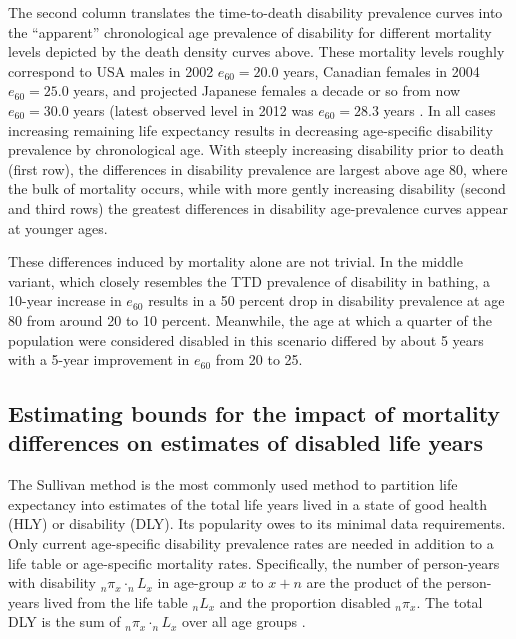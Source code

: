 \documentclass[11pt,oneside,a4paper]{article} %
\begin{document}
The second column translates the time-to-death disability prevalence curves into
the ``apparent'' chronological age prevalence of disability for different
mortality levels depicted by the death density curves above. These mortality
levels roughly correspond to USA males in 2002 $e_{60} = 20.0$ years, Canadian
females in 2004 $e_{60} = 25.0$ years, and projected Japanese females a decade
or so from now $e_{60} = 30.0$ years (latest observed level in 2012 was $e_{60}
= 28.3$ years \citep{HMD2015}. In all cases increasing remaining life
expectancy results in decreasing age-specific disability prevalence by
chronological age. With steeply increasing disability prior to death (first
row), the differences in disability prevalence are largest above age 80, where
the bulk of mortality occurs, while with more gently increasing disability
(second and third rows) the greatest differences in disability age-prevalence
curves appear at younger ages.

These differences induced by mortality alone are not trivial. In the middle variant, which closely resembles the TTD prevalence of disability in bathing, a 10-year increase in $e_{60}$ results in a 50 percent drop in disability prevalence at age 80 from around 20 to 10 percent. Meanwhile, the age at which a quarter of the population were considered disabled in this scenario differed by about 5 years with a 5-year improvement in $e_{60}$ from 20 to 25.





\FloatBarrier
\subsection{Estimating bounds for the impact of mortality differences on estimates of disabled life years}
\label{sec:bounds}
The Sullivan method is the most commonly used method to partition life
expectancy into estimates of the total life years lived in a state of good
health (HLY) or disability (DLY). Its popularity owes to its minimal data
requirements. Only current age-specific disability prevalence rates are needed
in addition to a life table or age-specific mortality rates. Specifically, the
number of person-years with disability $_{n}\pi _{x} \cdot _{n}L _{x}$ in
age-group $x$ to $x+n$ are the product of the person-years lived from the life
table $_{n}L _{x}$ and the proportion disabled $_{n}\pi _{x}$. The total DLY is
the sum of  $_{n}\pi _{x} \cdot _{n}L _{x}$ over all age groups
\citep{Sullivan1970}.
\end{document}
